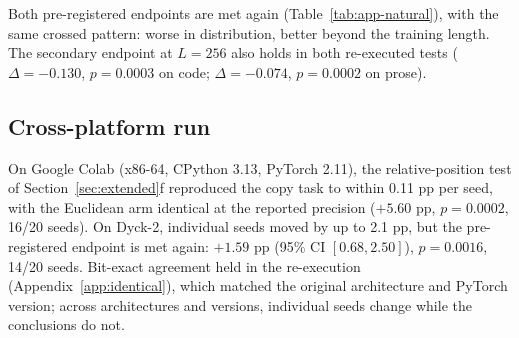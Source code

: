 \documentclass[11pt]{article}
\begin{document}
Both pre-registered endpoints are met again (Table~\ref{tab:app-natural}), with the same crossed pattern: worse in distribution, better beyond the training length. The secondary endpoint at $L{=}256$ also holds in both re-executed tests ($\Delta = -0.130$, $p = 0.0003$ on code; $\Delta = -0.074$, $p = 0.0002$ on prose).

\begin{table}[h]
\centering\small
{}
\caption{Stabilized kernel vs.\ Euclidean attention, extrapolative zone at $L{=}512$. Spread: seed-to-seed standard deviation of the Fisher--Rao arm over that of the Euclidean arm (pre-specified limit $1.5\times$). In-dist.\ $\Delta$: the $L{=}128$ control.}
\label{tab:app-natural}
\end{table}

\subsection{Cross-platform run}\label{app:colab}

On Google Colab (x86-64, CPython 3.13, PyTorch 2.11), the relative-position test of Section~\ref{sec:extended}f reproduced the copy task to within 0.11 pp per seed, with the Euclidean arm identical at the reported precision ($+5.60$ pp, $p = 0.0002$, 16/20 seeds). On Dyck-2, individual seeds moved by up to 2.1 pp, but the pre-registered endpoint is met again: $+1.59$ pp (95\% CI $[0.68, 2.50]$), $p = 0.0016$, 14/20 seeds. Bit-exact agreement held in the re-execution (Appendix~\ref{app:identical}), which matched the original architecture and PyTorch version; across architectures and versions, individual seeds change while the conclusions do not.
\end{document}
